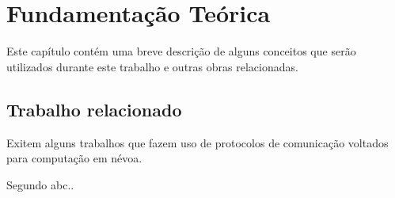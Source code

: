 \chapter{\label{chap:chap2} Fundamentação Teórica}




Este capítulo contém uma breve descrição de alguns conceitos que serão utilizados durante este trabalho e outras obras relacionadas.

\section{Trabalho relacionado}

Exitem alguns trabalhos que fazem uso de protocolos de comunicação voltados para computação em névoa.

Segundo abc..


